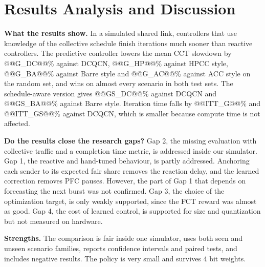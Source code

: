 \documentclass[conference]{IEEEtran}
\begin{document}
\section{Results Analysis and Discussion}
\textbf{What the results show.} In a simulated shared link, controllers that use knowledge of the collective schedule finish iterations much sooner than reactive controllers. The predictive controller lowers the mean CCT slowdown by @@G_DC@@\% against DCQCN, @@G_HP@@\% against HPCC style, @@G_BA@@\% against Barre style and @@G_AC@@\% against ACC style on the random set, and wins on almost every scenario in both test sets. The schedule-aware version gives @@GS_DC@@\% against DCQCN and @@GS_BA@@\% against Barre style. Iteration time falls by @@ITT_G@@\% and @@ITT_GS@@\% against DCQCN, which is smaller because compute time is not affected.

\textbf{Do the results close the research gaps?} Gap 2, the missing evaluation with collective traffic and a completion time metric, is addressed inside our simulator. Gap 1, the reactive and hand-tuned behaviour, is partly addressed. Anchoring each sender to its expected fair share removes the reaction delay, and the learned correction removes PFC pauses. However, the part of Gap 1 that depends on forecasting the next burst was not confirmed. Gap 3, the choice of the optimization target, is only weakly supported, since the FCT reward was almost as good. Gap 4, the cost of learned control, is supported for size and quantization but not measured on hardware.

\textbf{Strengths.} The comparison is fair inside one simulator, uses both seen and unseen scenario families, reports confidence intervals and paired tests, and includes negative results. The policy is very small and survives 4 bit weights.
\end{document}

